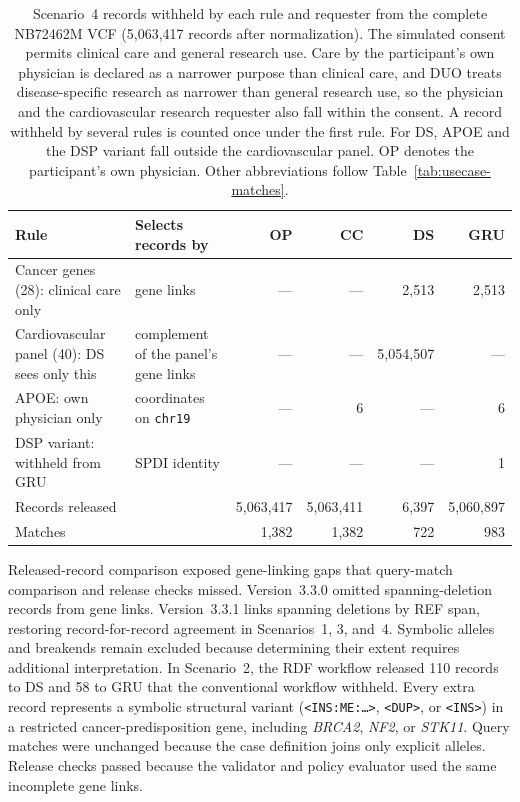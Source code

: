 \documentclass[11pt]{article}
\begin{document}
\begin{table}[!htbp]
\caption{Scenario~4 records withheld by each rule and requester from the complete NB72462M VCF (5,063,417 records after normalization).
The simulated consent permits clinical care and general research use.
Care by the participant's own physician is declared as a narrower purpose than clinical care, and DUO treats disease-specific research as narrower than general research use, so the physician and the cardiovascular research requester also fall within the consent.
A record withheld by several rules is counted once under the first rule.
For DS, APOE and the DSP variant fall outside the cardiovascular panel.
OP denotes the participant's own physician.
Other abbreviations follow Table~\ref{tab:usecase-matches}.}\label{tab:usecase-layered}%
\centering\footnotesize\setlength{\tabcolsep}{4pt}\renewcommand{\arraystretch}{1.1}%
\begin{tabularx}{\textwidth}{@{}l >{\raggedright\arraybackslash}X r r r r@{}}
\toprule
\textbf{Rule} & \textbf{Selects records by} & \textbf{OP} & \textbf{CC} & \textbf{DS} & \textbf{GRU}\\
\midrule
Cancer genes (28): clinical care only & gene links & --- & --- & 2{,}513 & 2{,}513\\
Cardiovascular panel (40): DS sees only this & complement of the panel's gene links & --- & --- & 5{,}054{,}507 & ---\\
APOE: own physician only & coordinates on \texttt{chr19} & --- & 6 & --- & 6\\
DSP variant: withheld from GRU & SPDI identity & --- & --- & --- & 1\\
\midrule
Records released & & 5{,}063{,}417 & 5{,}063{,}411 & 6{,}397 & 5{,}060{,}897\\
Matches & & 1{,}382 & 1{,}382 & 722 & 983\\
\bottomrule
\end{tabularx}
\end{table}

Released-record comparison exposed gene-linking gaps that query-match comparison and release checks missed.
Version~3.3.0 omitted spanning-deletion records from gene links.
Version~3.3.1 links spanning deletions by REF span, restoring record-for-record agreement in Scenarios~1, 3, and~4.
Symbolic alleles and breakends remain excluded because determining their extent requires additional interpretation.
In Scenario~2, the RDF workflow released 110 records to DS and 58 to GRU that the conventional workflow withheld.
Every extra record represents a symbolic structural variant (\texttt{<INS:ME:\ldots>}, \texttt{<DUP>}, or \texttt{<INS>}) in a restricted cancer-predisposition gene, including \textit{BRCA2}, \textit{NF2}, or \textit{STK11}.
Query matches were unchanged because the case definition joins only explicit alleles.
Release checks passed because the validator and policy evaluator used the same incomplete gene links.
\end{document}
